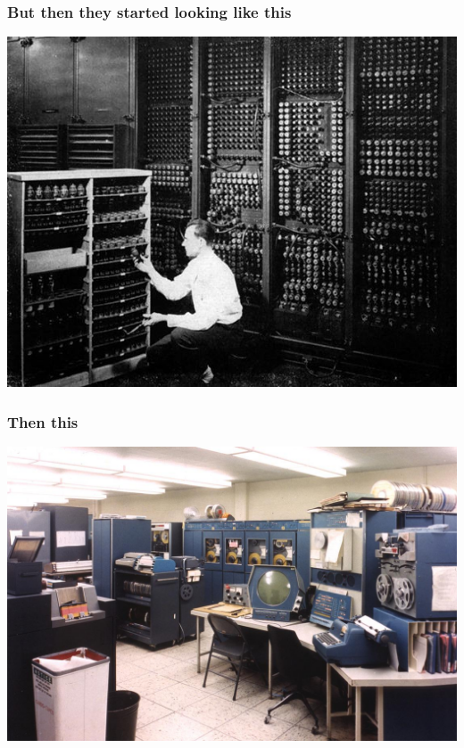 \documentclass[rgb,dvipsnames]{beamer}
\begin{document}
\begin{frame}
  \frametitle{But then they started looking like this}

  \begin{center}
    \includegraphics[width=\textwidth]{img/eniac.jpg}
  \end{center}
\end{frame}

\begin{frame}
  \frametitle{Then this}
  \begin{center}
    \includegraphics[width=\textwidth]{img/pdp1.jpg}
  \end{center}
\end{frame}
\end{document}

